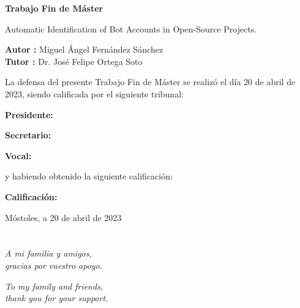 \documentclass[a4paper, 12pt]{book}
\begin{document}
\vspace{-4cm}
\begin{center}
\LARGE
\textbf{Trabajo Fin de Máster}

\vspace{1cm}
\large
Automatic Identification of Bot Accounts in Open-Source Projects.

\vspace{1cm}
\large
\textbf{Autor :} Miguel Ángel Fernández Sánchez \\
\textbf{Tutor :} Dr. José Felipe Ortega Soto

\end{center}

\vspace{1cm}
La defensa del presente Trabajo Fin de Máster se realizó el día 20 de abril
\newline de 2023, siendo calificada por el siguiente tribunal:


\vspace{0.5cm}
\textbf{Presidente:}

\vspace{0.8cm}
\textbf{Secretario:}

\vspace{0.8cm}
\textbf{Vocal:}


\vspace{0.8cm}
y habiendo obtenido la siguiente calificación:

\vspace{0.8cm}
\textbf{Calificación:}


\vspace{0.8cm}
\begin{flushright}
Móstoles, a 20 de abril de 2023
\end{flushright}


\chapter*{}
\begin{flushright}
\textit{A mi familia y amigos, \\
gracias por vuestro apoyo.}
\end{flushright}

\vspace{2cm}

\begin{flushright}
\textit{To my family and friends, \\
thank you for your support.}
\end{flushright}
\end{document}
